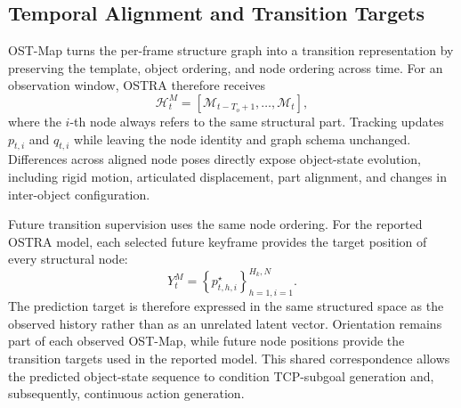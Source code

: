 \subsection{Temporal Alignment and Transition Targets}
\label{app:ost_map_temporal_alignment}

OST-Map turns the per-frame structure graph into a transition representation
by preserving the template, object ordering, and node ordering across time.
For an observation window, OSTRA therefore receives
\begin{equation}
    \mathcal{H}_t^M
    =
    \left[
    \mathcal{M}_{t-T_o+1},
    \ldots,
    \mathcal{M}_{t}
    \right],
    \label{eq:ost_map_history_full}
\end{equation}
where the $i$-th node always refers to the same structural part. Tracking
updates $p_{t,i}$ and $q_{t,i}$ while leaving the node identity and graph
schema unchanged. Differences across aligned node poses directly expose
object-state evolution, including rigid motion, articulated displacement,
part alignment, and changes in inter-object configuration.

Future transition supervision uses the same node ordering. For the reported
OSTRA model, each selected future keyframe provides the target position of
every structural node:
\begin{equation}
    Y_t^M
    =
    \left\{
    p^\star_{t,h,i}
    \right\}_{h=1,i=1}^{H_k,N}.
    \label{eq:future_map_target_appendix}
\end{equation}
The prediction target is therefore expressed in the same structured space as
the observed history rather than as an unrelated latent vector. Orientation
remains part of each observed OST-Map, while future node positions provide the
transition targets used in the reported model. This shared correspondence
allows the predicted object-state sequence to condition TCP-subgoal
generation and, subsequently, continuous action generation.
